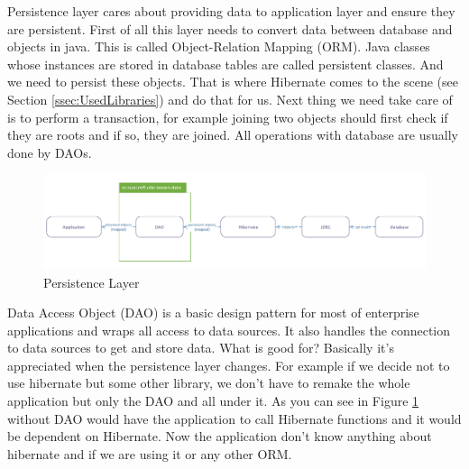 Persistence layer cares about providing data to application layer and ensure they
are persistent. First of all this layer needs to convert data between database and
objects in java. This is called Object-Relation Mapping (ORM). Java classes whose
instances are stored in database tables are called persistent classes. And we need
to persist these objects. That is where Hibernate comes to the scene (see Section
\ref{ssec:UsedLibraries}) and do that for us. Next thing we need take care of is
to perform a transaction, for example joining two objects should first check if
they are roots and if so, they are joined. All operations with database are usually
done by DAOs.

\begin{figure}[!htb]
        \centering
        \includegraphics[width=\textwidth]{Images/PersistentLayer}
        \caption{Persistence Layer}
        \label{fig:PersistentLayer}
\end{figure}

Data Access Object (DAO) is a basic design pattern for most of enterprise applications
and wraps all access to data sources. It also handles the connection to data sources
to get and store data. What is good for? Basically it's appreciated when the persistence
layer changes. For example if we decide not to use hibernate but some other library,
we don't have to remake the whole application but only the DAO and all under it.
As you can see in Figure \ref{fig:PersistentLayer} without DAO would have the application
to call Hibernate functions and it would be dependent on Hibernate. Now the application
don't know anything about hibernate and if we are using it or any other ORM.

